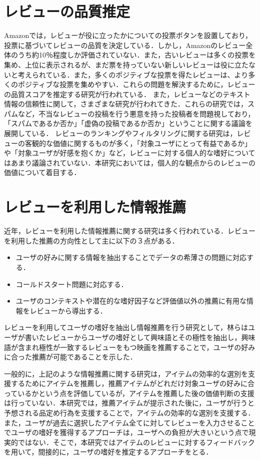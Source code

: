 \documentclass[a4paper,11pt,oneside,openany]{jsbook}
\begin{document}
	\section{レビューの品質推定}
Amazonでは，レビューが役に立ったかについての投票ボタンを設置しており，投票に基づいてレビューの品質を決定している．しかし，Amazonのレビュー全体のうち約10％程度しか評価されていない\cite{amazon}．また，古いレビューは多くの投票を集め、上位に表示されるが、まだ票を持っていない新しいレビューは役に立たないと考えられている\cite{Moghaddam}．また，多くのポジティブな投票を得たレビューは、より多くのポジティブな投票を集めやすい．これらの問題を解決するために，レビューの品質スコアを推定する研究が行われている\cite{Raghavan}．
また，レビューなどのテキスト情報の信頼性に関して，さまざまな研究が行われてきた\cite{iki,muk,xie,wang}．これらの研究では，スパムなど，不当なレビューの投稿を行う悪意を持った投稿者を問題視しており，「スパムであるか否か」「虚偽の投稿であるか否か」ということに関する議論を展開している．
レビューのランキングやフィルタリングに関する研究は，レビューの客観的な価値に関するものが多く，「対象ユーザにとって有益であるか」や「対象ユーザが好感を抱くか」など，レビューに対する個人的な嗜好についてはあまり議論されていない．本研究においては，個人的な観点からのレビューの価値について着目する．

	\section{レビューを利用した情報推薦}
近年，レビューを利用した情報推薦に関する研究は多く行われている．レビューを利用した推薦の方向性として主に以下の３点がある\cite{Li}．
\begin{itemize}
 \item ユーザの好みに関する情報を抽出することでデータの希薄さの問題に対応する．
 \item コールドスタート問題に対応する．
 \item ユーザのコンテキストや潜在的な嗜好因子など評価値以外の推薦に有用な情報をレビューから導出する．
\end{itemize}
\par
レビューを利用してユーザの嗜好を抽出し情報推薦を行う研究として，林ら\cite{hayashi}はユーザが書いたレビューからユーザの嗜好として興味語とその極性を抽出し，興味語が含まれ極性が一致するレビューをもつ映画を推薦することで，ユーザの好みに合った推薦が可能であることを示した．
\par
一般的に，上記のような情報推薦に関する研究は，アイテムの効率的な選別を支援するためにアイテムを推薦し，推薦アイテムがどれだけ対象ユーザの好みに合っているかという点を評価しているが，アイテムを推薦した後の価値判断の支援は行っていない．本研究では，推薦アイテムが提示された後に，ユーザが行うと予想される品定め行為を支援することで，アイテムの効率的な選別を支援する．
また，ユーザが過去に選択したアイテム全てに対してレビューを入力させることでユーザの嗜好を獲得するアプローチは，ユーザへの負担が大きいという点で現実的ではない．そこで，本研究ではアイテムのレビューに対するフィードバックを用いて，間接的に，ユーザの嗜好を推定するアプローチをとる．
\end{document}
